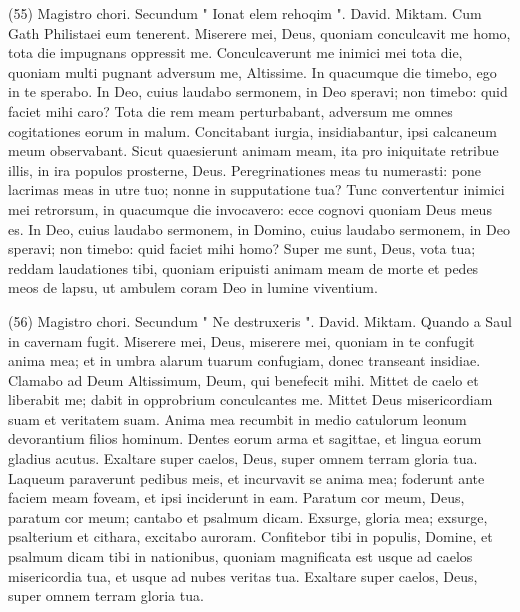 \begin{biblechapter}  (55) 
\verse  Magistro chori. Secundum " Ionat elem rehoqim ". David. Miktam. Cum Gath Philistaei eum tenerent. 
\verse Miserere mei, Deus, quoniam conculcavit me homo, tota die impugnans oppressit me. 
\verse Conculcaverunt me inimici mei tota die, quoniam multi pugnant adversum me, Altissime. 
\verse In quacumque die timebo, ego in te sperabo. 
\verse In Deo, cuius laudabo sermonem, in Deo speravi; non timebo: quid faciet mihi caro? 
\verse Tota die rem meam perturbabant, adversum me omnes cogitationes eorum in malum. 
\verse Concitabant iurgia, insidiabantur, ipsi calcaneum meum observabant. Sicut quaesierunt animam meam, 
\verse ita pro iniquitate retribue illis, in ira populos prosterne, Deus. 
\verse Peregrinationes meas tu numerasti: pone lacrimas meas in utre tuo; nonne in supputatione tua? 
\verse Tunc convertentur inimici mei retrorsum, in quacumque die invocavero: ecce cognovi quoniam Deus meus es. 
\verse In Deo, cuius laudabo sermonem, in Domino, cuius laudabo sermonem, 
\verse in Deo speravi; non timebo: quid faciet mihi homo? 
\verse Super me sunt, Deus, vota tua; reddam laudationes tibi, 
\verse quoniam eripuisti animam meam de morte et pedes meos de lapsu, ut ambulem coram Deo in lumine viventium. 
\end{biblechapter}

\begin{biblechapter}  (56) 
\verse  Magistro chori. Secundum " Ne destruxeris ". David. Miktam. Quando a Saul in cavernam fugit. 
\verse Miserere mei, Deus, miserere mei, quoniam in te confugit anima mea; et in umbra alarum tuarum confugiam, donec transeant insidiae. 
\verse Clamabo ad Deum Altissimum, Deum, qui benefecit mihi. 
\verse Mittet de caelo et liberabit me; dabit in opprobrium conculcantes me. Mittet Deus misericordiam suam et veritatem suam. 
\verse Anima mea recumbit in medio catulorum leonum devorantium filios hominum. Dentes eorum arma et sagittae, et lingua eorum gladius acutus. 
\verse Exaltare super caelos, Deus, super omnem terram gloria tua. 
\verse Laqueum paraverunt pedibus meis, et incurvavit se anima mea; foderunt ante faciem meam foveam, et ipsi inciderunt in eam. 
\verse Paratum cor meum, Deus, paratum cor meum; 
\verse cantabo et psalmum dicam. Exsurge, gloria mea; exsurge, psalterium et cithara, excitabo auroram. 
\verse Confitebor tibi in populis, Domine, et psalmum dicam tibi in nationibus, 
\verse quoniam magnificata est usque ad caelos misericordia tua, et usque ad nubes veritas tua. 
\verse Exaltare super caelos, Deus, super omnem terram gloria tua. 
\end{biblechapter}

